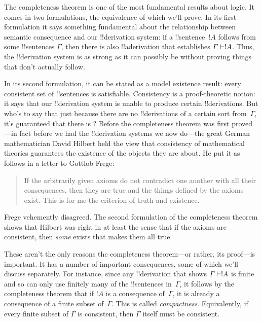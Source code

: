 \documentclass[../../../include/open-logic-section]{subfiles}
\begin{document}
      {}
      {}


The completeness theorem is one of the most fundamental results about
logic.  It comes in two formulations, the equivalence of which we'll
prove.  In its first formulation it says something fundamental about
the relationship between semantic consequence and our !!{derivation}
system: if a !!{sentence}~$!A$ follows from some !!{sentence}s
$\Gamma$, then there is also !!a{derivation} that establishes $\Gamma
\Proves !A$. Thus, the !!{derivation} system is as strong as it can
possibly be without proving things that don't actually follow.

In its second formulation, it can be stated as a model existence
result: every consistent set of !!{sentence}s is satisfiable.
Consistency is a proof-theoretic notion: it says that our
!!{derivation} system is unable to produce certain !!{derivation}s.
But who's to say that just because there are no !!{derivation}s of a
certain sort from~$\Gamma$, it's guaranteed that there is
? Before the
completeness theorem was first proved---in fact before we had the
!!{derivation} systems we now do---the great German mathematician
David Hilbert held the view that consistency of mathematical theories
guarantees the existence of the objects they are about. He put it as
follows in a letter to Gottlob Frege:
\begin{quote}
  If the arbitrarily given axioms do not contradict one another with
  all their consequences, then they are true and the things defined by
  the axioms exist. This is for me the criterion of truth and
  existence. 
\end{quote}
Frege vehemently disagreed. The second formulation of the completeness
theorem shows that Hilbert was right in at least the sense that if the
axioms are consistent, then \emph{some}
 exists that makes them all
true.

These aren't the only reasons the completeness theorem---or rather,
its proof---is important.  It has a number of important consequences,
some of which we'll discuss separately.  For instance, since any
!!{derivation} that shows $\Gamma \Proves !A$ is finite and so can
only use finitely many of the !!{sentence}s in~$\Gamma$, it follows by
the completeness theorem that if $!A$ is a consequence of~$\Gamma$, it
is already a consequence of a finite subset of~$\Gamma$.  This is
called \emph{compactness}.  Equivalently, if every finite subset of
$\Gamma$ is consistent, then $\Gamma$ itself must be consistent.
\end{document}
